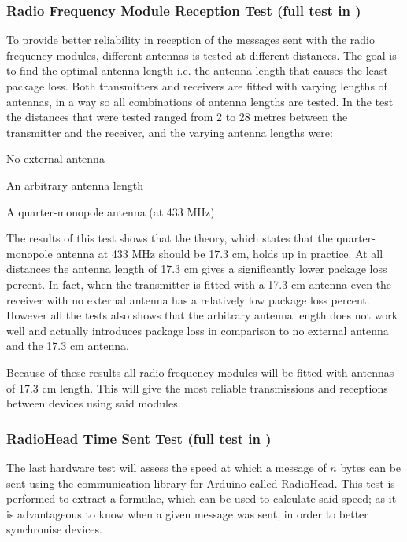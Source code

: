 \subsubsection*{Radio Frequency Module Reception Test (full test in )} %
\label{ssub:radio_frequency_module_reception_test}
To provide better reliability in reception of the messages sent with the radio frequency modules, different antennas is tested at different distances.
The goal is to find the optimal antenna length i.e. the antenna length that causes the least package loss.
Both transmitters and receivers are fitted with varying lengths of antennas, in a way so all combinations of antenna lengths are tested. 
In the test the distances that were tested ranged from 2 to 28 metres between the transmitter and the receiver, and the varying antenna lengths were:
\begin{description}[labelindent=\parindent]
    \item[0 cm] No external antenna
    \item[12 cm] An arbitrary antenna length
    \item[17.3 cm] A quarter-monopole antenna (at 433 MHz)
\end{description} 
\noindent
The results of this test shows that the theory, which states that the quarter-monopole antenna at 433 MHz should be 17.3 cm, holds up in practice.
At all distances the antenna length of 17.3 cm gives a significantly lower package loss percent.
In fact, when the transmitter is fitted with a 17.3 cm antenna even the receiver with no external antenna has a relatively low package loss percent.
However all the tests also shows that the arbitrary antenna length does not work well and actually introduces package loss in comparison to no external antenna and the 17.3 cm antenna.

Because of these results all radio frequency modules will be fitted with antennas of 17.3 cm length.
This will give the most reliable transmissions and receptions between devices using said modules.

\subsubsection*{RadioHead Time Sent Test (full test in )} %
\label{ssub:radiohead_time_sent_test}
The last hardware test will assess the speed at which a message of $n$ bytes can be sent using the communication library for Arduino called RadioHead.
This test is performed to extract a formulae, which can be used to calculate said speed; as it is advantageous to know when a given message was sent, in order to better synchronise devices.   

